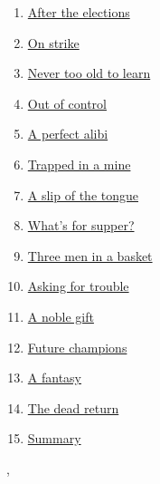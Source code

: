 \documentclass[11pt]{article}
\renewcommand{\today}{\shortmonthname[\the\month] \the \day,  \the\year}
\begin{document}
\begin{multicols}{2}
\begin{enumerate}
		\item \href{https://mp.weixin.qq.com/s/mtZnCo-vtLriAhP9uvOqmw}{After the elections }	%
		\item \href{https://mp.weixin.qq.com/s/gO1F1vFNzyZpBMzpNvf4_Q}{On strike}	%
		\item \href{https://mp.weixin.qq.com/s/dBF14SQCYm6oX181mh9OXA}{Never too old to learn}	%
		\item \href{https://mp.weixin.qq.com/s/fcGTmXoei0482jg3u5ZtKA}{Out of control}	%
		\item \href{https://mp.weixin.qq.com/s/BNIgNZEkZrebnm0b4CBLbg}{A perfect alibi}	%
		\item \href{https://mp.weixin.qq.com/s/qH5DjyI8X2xoUQEnsQ0Lug}{Trapped in a mine}	%
		\item \href{https://mp.weixin.qq.com/s/9YtZFrgKKC2nej24VdQVnw}{A slip of the tongue}	%
		\item \href{https://mp.weixin.qq.com/s/KdRLmNADSRStB-7eIVbGNA}{What's for supper?}	%
		\item \href{https://mp.weixin.qq.com/s/0UtfhJdaZk9PJ9LFqjFZlQ}{Three men in a basket}	%
		\item \href{https://mp.weixin.qq.com/s/8YKO3pJEVsreMVZ83XnmkA}{Asking for trouble}	%
		\item \href{https://mp.weixin.qq.com/s/LfJGuLHbOaqUKHRZzHiYWA}{A noble gift }	%
		\item \href{https://mp.weixin.qq.com/s/JcWAf-dE_yfRzIVX4B1PSg}{Future champions}	%
		\item \href{https://mp.weixin.qq.com/s/cOru0kWrAUdDFJ9o4FyikQ}{A fantasy}	%
		\item \href{https://mp.weixin.qq.com/s/L6QjfqOjb96nyu8ZpZpU1A}{The dead return}	%
		\item \href{https://mp.weixin.qq.com/s/ampMYXE-n1BGAQoUDUR0Bg}{Summary}	%
	\end{enumerate}
\end{multicols}


%
\begin{flushright}
	\tiny \today 
\end{flushright}
\end{document}
